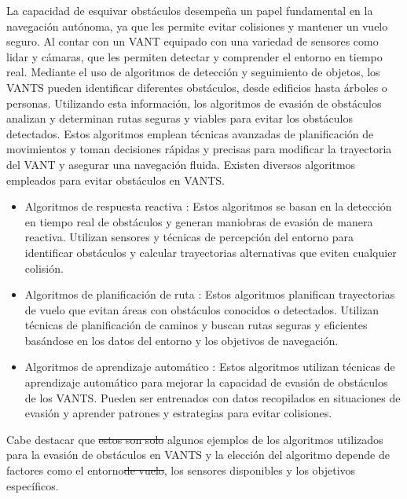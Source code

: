 \documentclass[sigconf]{acmart}
\providecommand{\DIFadd}[1]{{\protect\color{blue}\uwave{#1}}} %
\providecommand{\DIFdel}[1]{{\protect\color{red}\sout{#1}}}                      %
\providecommand{\DIFaddbegin}{} %
\providecommand{\DIFaddend}{} %
\providecommand{\DIFdelbegin}{} %
\providecommand{\DIFdelend}{} %
\begin{document}
La capacidad de esquivar obstáculos desempeña un papel fundamental en la navegación autónoma, ya que les permite evitar colisiones y mantener un vuelo seguro. Al contar con un VANT equipado con una variedad de sensores como lidar y cámaras, que les permiten detectar y comprender el entorno en tiempo real. Mediante el uso de algoritmos de detección y seguimiento de objetos, los VANTS pueden identificar diferentes obstáculos, desde edificios hasta árboles o personas. Utilizando esta información, los algoritmos de evasión de obstáculos analizan y determinan rutas seguras y viables para evitar los obstáculos detectados. Estos algoritmos emplean técnicas avanzadas de planificación de movimientos y toman decisiones rápidas y precisas para modificar la trayectoria del VANT y asegurar una navegación fluida. Existen diversos algoritmos empleados para evitar obstáculos en VANTS.

\begin{itemize}
\item Algoritmos de respuesta reactiva \DIFaddbegin \DIFadd{\mbox{%
\cite{ReactiveCA}}\hspace{0pt}%
}\DIFaddend : Estos algoritmos se basan en la detección en tiempo real de obstáculos y generan maniobras de evasión de manera reactiva. Utilizan sensores y técnicas de percepción del entorno para identificar obstáculos y calcular trayectorias alternativas que eviten cualquier colisión.
\item Algoritmos de planificación de ruta \DIFaddbegin \DIFadd{\mbox{%
\cite{ACA}}\hspace{0pt}%
}\DIFaddend : Estos algoritmos planifican trayectorias de vuelo que evitan áreas con obstáculos conocidos o detectados. Utilizan técnicas de planificación de caminos y buscan rutas seguras y eficientes basándose en los datos del entorno y los objetivos de navegación.
\item Algoritmos de aprendizaje automático \DIFaddbegin \DIFadd{\mbox{%
\cite{AACA}}\hspace{0pt}%
}\DIFaddend : Estos algoritmos utilizan técnicas de aprendizaje automático para mejorar la capacidad de evasión de obstáculos de los VANTS. Pueden ser entrenados con datos recopilados en situaciones de evasión y aprender patrones y estrategias para evitar colisiones.
\end{itemize}

Cabe destacar que \DIFdelbegin \DIFdel{estos son solo }\DIFdelend \DIFaddbegin \DIFadd{éstos son sólo }\DIFaddend algunos ejemplos de los algoritmos utilizados para la evasión de obstáculos en VANTS y la elección del algoritmo depende de factores como el entorno\DIFdelbegin \DIFdel{de vuelo}\DIFdelend , los sensores disponibles y los objetivos específicos.
\end{document}

